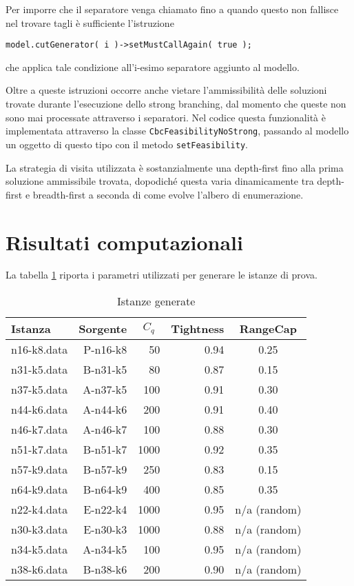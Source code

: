 \documentclass[11pt,oneside,a4paper]{article}
\begin{document}
Per imporre che il separatore venga chiamato fino a quando questo non fallisce nel trovare tagli è
sufficiente l'istruzione
\begin{verbatim}
model.cutGenerator( i )->setMustCallAgain( true );
\end{verbatim}
che applica tale condizione all'i-esimo separatore aggiunto al modello. 

Oltre a queste istruzioni occorre anche vietare l'ammissibilità delle soluzioni trovate
durante l'esecuzione dello strong branching, dal momento che queste non sono mai processate
attraverso i separatori. %
Nel codice questa funzionalità è implementata attraverso la classe
\texttt{CbcFeasibilityNoStrong}, passando al modello un oggetto di questo tipo con il
metodo \texttt{setFeasibility}.

La strategia di visita utilizzata è sostanzialmente una depth-first fino alla prima soluzione ammissibile
trovata, dopodiché questa varia dinamicamente tra depth-first e breadth-first a seconda di come evolve
l'albero di enumerazione.

\section{Risultati computazionali}
La tabella \ref{t_inst} riporta i parametri utilizzati per generare le istanze di
prova.

\begin{table}[h]
\centering
\begin{tabular}{|l|r|r|r|c|}
\hline
\multicolumn{1}{|l|}{Istanza} &
\multicolumn{1}{l|}{Sorgente} &
\multicolumn{1}{c|}{$C_q$} &
\multicolumn{1}{c|}{Tightness} &
\multicolumn{1}{c|}{RangeCap} \\
\hline
n16-k8.data & P-n16-k8 & 50  & 0.94 & 0.25 \\
n31-k5.data & B-n31-k5 & 80  & 0.87 & 0.15 \\
n37-k5.data & A-n37-k5 & 100 & 0.91 & 0.30  \\
n44-k6.data & A-n44-k6 & 200 & 0.91 & 0.40 \\
n46-k7.data & A-n46-k7 & 100 & 0.88 & 0.30  \\
n51-k7.data & B-n51-k7 & 1000 & 0.92 & 0.35 \\
n57-k9.data & B-n57-k9 & 250 & 0.83 & 0.15 \\
n64-k9.data & B-n64-k9 & 400 & 0.85 & 0.35 \\
n22-k4.data & E-n22-k4 & 1000 & 0.95 & n/a (random) \\
n30-k3.data & E-n30-k3 & 1000 & 0.88 & n/a (random) \\
n34-k5.data & A-n34-k5 & 100 & 0.95 & n/a (random) \\
n38-k6.data & B-n38-k6 & 200 & 0.90 & n/a (random) \\
\hline
\end{tabular}
\caption{Istanze generate}\label{t_inst}
\end{table}
\end{document}
